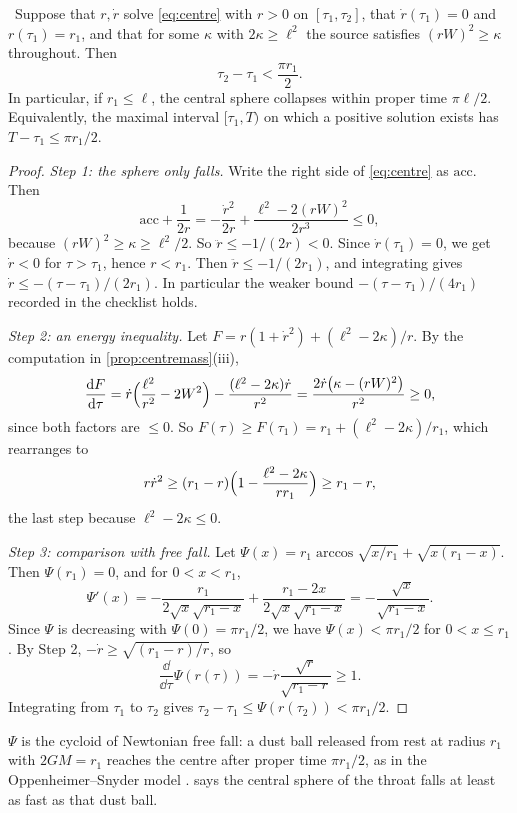 \begin{theorem}\label{thm:centrecollapse}\ver\
Suppose that $r,\dot r$ solve \eqref{eq:centre} with $r>0$ on $[\tau_1,\tau_2]$, that $\dot r(\tau_1)=0$ and $r(\tau_1)=r_1$, and that for some $\kappa$ with $2\kappa\ge\ell^2$ the source satisfies $(rW)^2\ge\kappa$ throughout. Then
\[
\tau_2-\tau_1<\frac{\pi r_1}2 .
\]
In particular, if $r_1\le\ell$, the central sphere collapses within proper time $\pi\ell/2$. Equivalently, the maximal interval $[\tau_1,T)$ on which a positive solution exists has $T-\tau_1\le\pi r_1/2$.
\end{theorem}
\begin{proof}
\emph{Step 1: the sphere only falls.} Write the right side of \eqref{eq:centre} as $\mathrm{acc}$. Then
\[
\mathrm{acc}+\frac1{2r}=-\frac{\dot r^2}{2r}+\frac{\ell^2-2(rW)^2}{2r^3}\le0 ,
\]
because $(rW)^2\ge\kappa\ge\ell^2/2$. So $\ddot r\le-1/(2r)<0$. Since $\dot r(\tau_1)=0$, we get $\dot r<0$ for $\tau>\tau_1$, hence $r<r_1$. Then $\ddot r\le-1/(2r_1)$, and integrating gives $\dot r\le-(\tau-\tau_1)/(2r_1)$. In particular the weaker bound $-(\tau-\tau_1)/(4r_1)$ recorded in the checklist holds.

\emph{Step 2: an energy inequality.} Let $F=r(1+\dot r^2)+(\ell^2-2\kappa)/r$. By the computation in \cref{prop:centremass}(iii),
\[
\frac{\mathrm{d} F}{\mathrm{d}\tau}=\dot r\Bigl(\frac{\ell^2}{r^2}-2W^2\Bigr)-\frac{(\ell^2-2\kappa)\dot r}{r^2}=\frac{2\dot r\bigl(\kappa-(rW)^2\bigr)}{r^2}\ge0 ,
\]
since both factors are $\le0$. So $F(\tau)\ge F(\tau_1)=r_1+(\ell^2-2\kappa)/r_1$, which rearranges to
\[
r\dot r^2\ge(r_1-r)\Bigl(1-\frac{\ell^2-2\kappa}{rr_1}\Bigr)\ge r_1-r ,
\]
the last step because $\ell^2-2\kappa\le0$.

\emph{Step 3: comparison with free fall.} Let $\Psi(x)=r_1\arccos\sqrt{x/r_1}+\sqrt{x(r_1-x)}$. Then $\Psi(r_1)=0$, and for $0<x<r_1$,
\[
\Psi'(x)=-\frac{r_1}{2\sqrt x\sqrt{r_1-x}}+\frac{r_1-2x}{2\sqrt x\sqrt{r_1-x}}=-\frac{\sqrt x}{\sqrt{r_1-x}} .
\]
Since $\Psi$ is decreasing with $\Psi(0)=\pi r_1/2$, we have $\Psi(x)<\pi r_1/2$ for $0<x\le r_1$. By Step 2, $-\dot r\ge\sqrt{(r_1-r)/r}$, so
\[
\frac{\dd}{\dd\tau}\Psi(r(\tau))=-\dot r\frac{\sqrt r}{\sqrt{r_1-r}}\ge1 .
\]
Integrating from $\tau_1$ to $\tau_2$ gives $\tau_2-\tau_1\le\Psi(r(\tau_2))<\pi r_1/2$.
\end{proof}


$\Psi$ is the cycloid of Newtonian free fall: a dust ball released from rest at radius $r_1$ with $2GM=r_1$ reaches the centre after proper time $\pi r_1/2$, as in the Oppenheimer--Snyder model \cite{OppenheimerSnyder1939}.  says the central sphere of the throat falls at least as fast as that dust ball.

